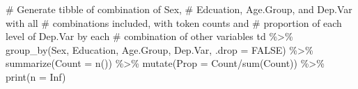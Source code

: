 \documentclass[
  12pt,
  letterpaper]{article}
\newenvironment{Shaded}{\begin{snugshade}}{\end{snugshade}}
\newcommand{\AttributeTok}[1]{\textcolor[rgb]{0.40,0.45,0.13}{#1}}
\newcommand{\CommentTok}[1]{\textcolor[rgb]{0.37,0.37,0.37}{#1}}
\newcommand{\ConstantTok}[1]{\textcolor[rgb]{0.56,0.35,0.01}{#1}}
\newcommand{\FunctionTok}[1]{\textcolor[rgb]{0.28,0.35,0.67}{#1}}
\newcommand{\NormalTok}[1]{\textcolor[rgb]{0.00,0.23,0.31}{#1}}
\newcommand{\SpecialCharTok}[1]{\textcolor[rgb]{0.37,0.37,0.37}{#1}}
\begin{document}
\begin{Shaded}
\begin{Highlighting}[]
\CommentTok{\# Generate tibble of combination of Sex,}
\CommentTok{\# Edcuation, Age.Group, and Dep.Var with all}
\CommentTok{\# combinations included, with token counts and}
\CommentTok{\# proportion of each level of Dep.Var by each}
\CommentTok{\# combination of other variables}
\NormalTok{td }\SpecialCharTok{\%\textgreater{}\%}
    \FunctionTok{group\_by}\NormalTok{(Sex, Education, Age.Group, Dep.Var, }\AttributeTok{.drop =} \ConstantTok{FALSE}\NormalTok{) }\SpecialCharTok{\%\textgreater{}\%}
    \FunctionTok{summarize}\NormalTok{(}\AttributeTok{Count =} \FunctionTok{n}\NormalTok{()) }\SpecialCharTok{\%\textgreater{}\%}
    \FunctionTok{mutate}\NormalTok{(}\AttributeTok{Prop =}\NormalTok{ Count}\SpecialCharTok{/}\FunctionTok{sum}\NormalTok{(Count)) }\SpecialCharTok{\%\textgreater{}\%}
    \FunctionTok{print}\NormalTok{(}\AttributeTok{n =} \ConstantTok{Inf}\NormalTok{)}
\end{Highlighting}
\end{Shaded}
\end{document}
